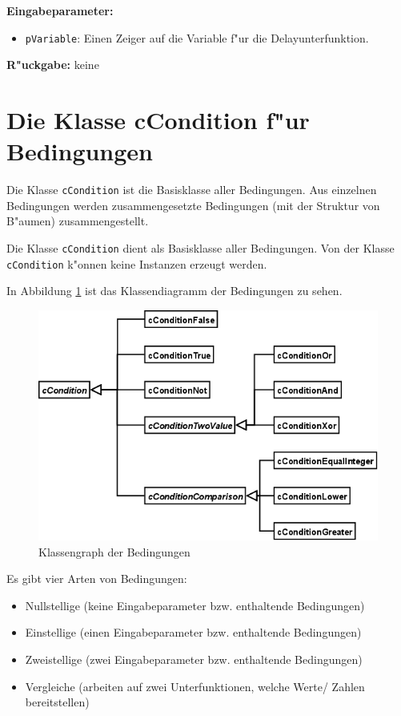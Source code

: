 \bigskip\noindent
\textbf{Eingabeparameter:}
\begin{itemize}
 \item \verb|pVariable|: Einen Zeiger auf die Variable f"ur die Delayunterfunktion.
\end{itemize}

\bigskip\noindent
\textbf{R"uckgabe:} keine




\section{Die Klasse cCondition f"ur Bedingungen}
\label{secCCondition}

Die Klasse \verb|cCondition| ist die Basisklasse aller Bedingungen. Aus einzelnen Bedingungen werden zusammengesetzte Bedingungen (mit der Struktur von B"aumen) zusammengestellt.

Die Klasse \verb|cCondition| dient als Basisklasse aller Bedingungen. Von der Klasse \verb|cCondition| k"onnen keine Instanzen erzeugt werden.

In Abbildung \ref{figClassConditions} ist das Klassendiagramm der Bedingungen zu sehen.

\begin{figure}[htbp]
\begin{center}
  \includegraphics[scale=0.4]{fib_conditions}
\end{center}
\caption{Klassengraph der Bedingungen}
\label{figClassConditions}
\end{figure}


\bigskip\noindent
Es gibt vier Arten von Bedingungen:
\begin{itemize}
 \item Nullstellige (keine Eingabeparameter bzw. enthaltende Bedingungen)
 \item Einstellige (einen Eingabeparameter bzw. enthaltende Bedingungen)
 \item Zweistellige (zwei Eingabeparameter bzw. enthaltende Bedingungen)
 \item Vergleiche (arbeiten auf zwei Unterfunktionen, welche Werte/ Zahlen bereitstellen)
\end{itemize}

